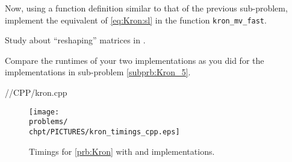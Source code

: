 \begin{problem}
\begin{subproblem}[3] \label{subprb:kron:8}
  Now, using a function definition similar to that of the previous sub-problem,
  implement the \Cpp{} equivalent of \eqref{eq:Kron:sl} in the function
  \texttt{kron\_mv\_fast}. 

  \begin{hint}
    Study  about ``reshaping'' matrices in \eigen{}.
  \end{hint}
\end{subproblem}

\begin{subproblem}[3] \label{subprb:kron:9}
  Compare the runtimes of your two implementations as you did for the \matlab{}
  implementations in sub-problem \ref{subprb:Kron_5}. 

\begin{solution}

{\problems/\chpt/CPP/kron.cpp}

\begin{figure}[htb]
\centering
\texttt{[image: \\problems/\\chpt/PICTURES/kron\_timings\_cpp.eps]}
\caption{Timings for \ref{prb:Kron} with \Matlab and \Cpp implementations.} \label{fig:kron_timings}
\end{figure}
\end{solution}

\end{subproblem}

\end{problem}